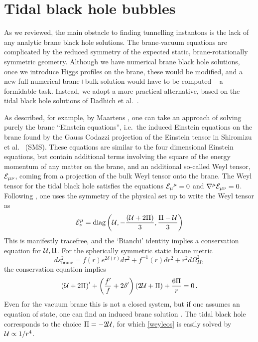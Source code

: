\documentclass[aps,12pt,prd,superscriptaddress,preprintnumbers, 
	amssymb,
	amsmath,
	notitlepage,
	longbibliography,
	nofootinbib]{revtex4-1}
\newcommand{\be}{\begin{equation}}
\newcommand{\ee}{\end{equation}}
\begin{document}
\section{Tidal black hole bubbles}
\label{sec:bubble}

As we reviewed, the main obstacle to finding tunnelling instantons is the 
lack of any analytic brane black hole solutions. The brane-vacuum
equations are complicated by the reduced symmetry of the expected
static, brane-rotationally symmetric geometry. Although we
have numerical brane black hole solutions, once we introduce Higgs
profiles on the brane, these would be modified, and a new full
numerical brane$+$bulk solution would have to be computed --
a formidable task. Instead, we adopt a more practical alternative, 
based on the tidal black hole solutions of Dadhich et al.\ \cite{Dadhich:2000am}.

As described, for example, by Maartens \cite{Maartens:2000fg}, one can take
an approach of solving purely the brane ``Einstein equations'',
i.e.\ the induced Einstein equations on the brane found by the Gauss
Codazzi projection of the Einstein tensor in Shiromizu et al.\  
\cite{Shiromizu:1999wj} (SMS). These equations are similar to the four
dimensional Einstein equations, but contain additional terms involving
the square of the energy momentum of any matter on the brane, and
an additional so-called Weyl tensor, ${\cal E}_{\mu\nu}$, 
coming from a projection of the bulk Weyl tensor onto the brane.
The Weyl tensor for the tidal black hole satisfies the equations 
${\cal E}_\mu{}^\mu=0$ and $\nabla^\mu{\cal E}_{\mu\nu}=0$. 
Following \cite{Maartens:2000fg}, one uses the symmetry of the
physical set up to write the Weyl tensor as
\be
{\cal E}^\mu_\nu = \text{diag} \left ( {\cal U} , -\frac{({\cal U} + 2\Pi)}{3},
\frac{\Pi - {\cal U}}{3} \right)
\ee
This is manifestly tracefree, and the `Bianchi' identity 
implies a conservation equation for ${\cal U}, \Pi$. For the spherically
symmetric static brane metric
\be
ds^2_{\text{brane}} = f(r) e^{2\delta(r)}d\tau^2
+f^{-1}(r) dr^2 + r^2 d\Omega^2_{I\!I},
\label{genbranemet}
\ee
the conservation equation implies
\be
\left ( {\cal U} + 2\Pi \right) ' + \left ( \frac{f'}{f} + 2\delta' \right)
\left ( 2{\cal U} + \Pi \right) +  \frac{6\Pi }{r} = 0\,.
\label{weyleos}
\ee
Even for the vacuum brane this is not a closed system, but if
one assumes an equation of state, one can find an induced 
brane solution \cite{Gregory:2004vt}. The tidal black hole 
corresponds to the choice $\Pi = -2{\cal U}$, for which
\eqref{weyleos} is easily solved by ${\cal U} \propto 1/r^4$.
\end{document}
